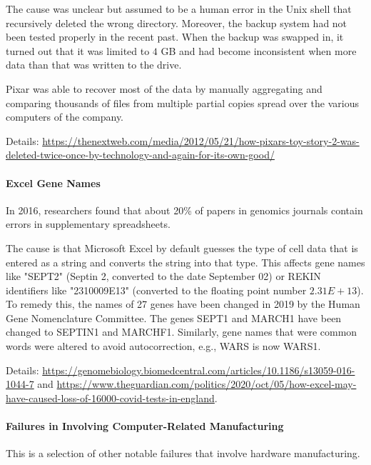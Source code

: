 The cause was unclear but assumed to be a human error in the Unix shell that recursively deleted the wrong directory.
Moreover, the backup system had not been tested properly in the recent past.
When the backup was swapped in, it turned out that it was limited to $4$ GB and had become inconsistent when more data than that was written to the drive.

Pixar was able to recover most of the data by manually aggregating and comparing thousands of files from multiple partial copies spread over the various computers of the company.

Details: \url{https://thenextweb.com/media/2012/05/21/how-pixars-toy-story-2-was-deleted-twice-once-by-technology-and-again-for-its-own-good/}

\paragraph{Excel Gene Names}
In 2016, researchers found that about 20\% of papers in genomics journals contain errors in supplementary spreadsheets.

The cause is that Microsoft Excel by default guesses the type of cell data that is entered as a string and converts the string into that type.
This affects gene names like "SEPT2" (Septin 2, converted to the date September 02) or REKIN identifiers like "2310009E13" (converted to the floating point number $2.31E+13$).
To remedy this, the names of 27 genes have been changed in 2019 by the Human Gene Nomenclature Committee.
The genes SEPT1 and MARCH1 have been changed to SEPTIN1 and MARCHF1.
Similarly, gene names that were common words were altered to avoid autocorrection, e.g., WARS is now WARS1.

Details: \url{https://genomebiology.biomedcentral.com/articles/10.1186/s13059-016-1044-7}
and \url{https://www.theguardian.com/politics/2020/oct/05/how-excel-may-have-caused-loss-of-16000-covid-tests-in-england}.


\paragraph{Failures in Involving Computer-Related Manufacturing}
This is a selection of other notable failures that involve hardware manufacturing.

